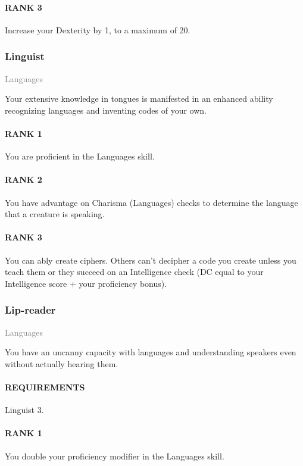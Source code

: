 \paragraph{RANK 3} Increase your Dexterity by 1, to a maximum of 20.

\subsubsection{Linguist} \label{feat::linguist}
\small{\textcolor{gray}{Languages}}

\normalsize
Your extensive knowledge in tongues is manifested in an enhanced ability recognizing languages and inventing codes of your own.
\paragraph{RANK 1} You are proficient in the Languages skill.
\paragraph{RANK 2} You have advantage on Charisma (Languages) checks to determine the language that a creature is speaking.
\paragraph{RANK 3} You can ably create ciphers.
Others can't decipher a code you create unless you teach them or they succeed on an Intelligence check (DC equal to your Intelligence score + your proficiency bonus).

\subsubsection{Lip-reader} \label{feat::lipreader}
\small{\textcolor{gray}{Languages}}

\normalsize
You have an uncanny capacity with languages and understanding speakers even without actually hearing them.
\paragraph{REQUIREMENTS} Linguist 3.
\paragraph{RANK 1} You double your proficiency modifier in the Languages skill.
